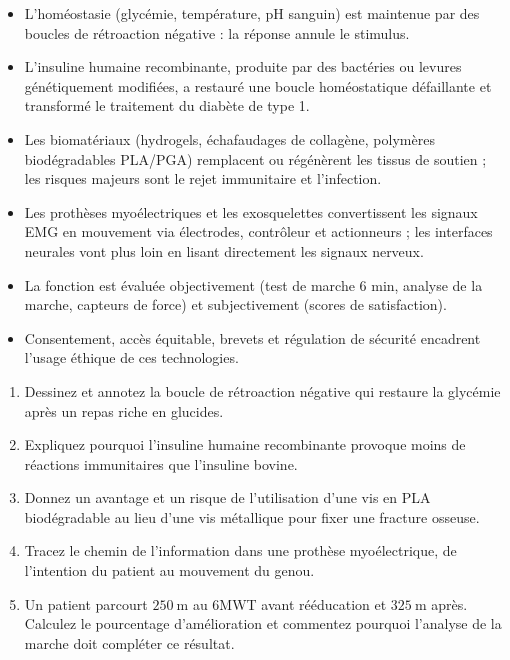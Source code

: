 \documentclass[11pt]{article}
\newcommand{\cle}[1]{{\popxbold\color{popdark}#1}}
\begin{document}
\begin{aretenir}
\begin{itemize}
\item L'homéostasie (glycémie, température, pH sanguin) est maintenue par des \cle{boucles de rétroaction négative} : la réponse annule le stimulus.
\item L'insuline humaine recombinante, produite par des bactéries ou levures génétiquement modifiées, a restauré une boucle homéostatique défaillante et transformé le traitement du diabète de type 1.
\item Les \cle{biomatériaux} (hydrogels, échafaudages de collagène, polymères biodégradables PLA/PGA) remplacent ou régénèrent les tissus de soutien ; les risques majeurs sont le rejet immunitaire et l'infection.
\item Les prothèses myoélectriques et les exosquelettes convertissent les \cle{signaux EMG} en mouvement via électrodes, contrôleur et actionneurs ; les interfaces neurales vont plus loin en lisant directement les signaux nerveux.
\item La fonction est évaluée objectivement (test de marche 6 min, analyse de la marche, capteurs de force) et subjectivement (scores de satisfaction).
\item Consentement, accès équitable, brevets et régulation de sécurité encadrent l'usage éthique de ces technologies.
\end{itemize}
\end{aretenir}

\begin{exercice}
\begin{enumerate}
\item Dessinez et annotez la boucle de rétroaction négative qui restaure la glycémie après un repas riche en glucides.
\item Expliquez pourquoi l'insuline humaine recombinante provoque moins de réactions immunitaires que l'insuline bovine.
\item Donnez un avantage et un risque de l'utilisation d'une vis en PLA biodégradable au lieu d'une vis métallique pour fixer une fracture osseuse.
\item Tracez le chemin de l'information dans une prothèse myoélectrique, de l'intention du patient au mouvement du genou.
\item Un patient parcourt $250\ \mathrm{m}$ au 6MWT avant rééducation et $325\ \mathrm{m}$ après. Calculez le pourcentage d'amélioration et commentez pourquoi l'analyse de la marche doit compléter ce résultat.
\end{enumerate}
\end{exercice}
\end{document}

